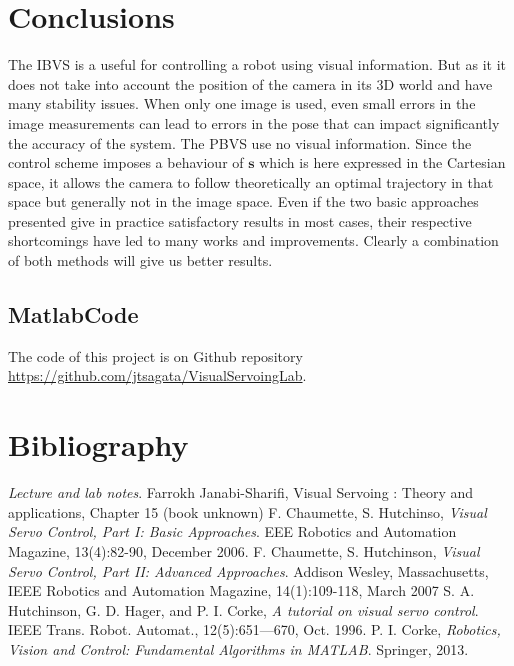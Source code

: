 \documentclass[a4paper,12pt]{article}
\begin{document}
\section{Conclusions}
The IBVS is a useful for controlling a robot using visual information. But as it it does not take into
account the position of the camera in its 3D world and have many stability issues.   When  only  one
image  is  used,  even  small  errors  in  the  image  measurements can lead to errors in the pose that can impact significantly the accuracy of the system.
The  PBVS use no visual information.  Since  the  control  scheme  imposes  a  behaviour  of  $\mathbf{s}$ which  is  here  expressed  in  the  Cartesian  space,  it  allows  the camera  to  follow  theoretically  an  optimal  trajectory  in  that space  but  generally  not  in  the  image  space. 
Even if the two basic approaches presented   give in practice satisfactory results in most cases, their
respective shortcomings have led to many works and improvements. Clearly a combination of both methods will give us better results.
\subsection{MatlabCode}
The code of this project is on Github repository \url{https://github.com/jtsagata/VisualServoingLab}.
\FloatBarrier
\section{Bibliography}
\begin{thebibliography}{9}
  \emph{Lecture and lab notes}.
  Farrokh Janabi-Sharifi,
  Visual Servoing : Theory and applications, Chapter 15 (book unknown)
  F. Chaumette, S. Hutchinso,
  \emph{ Visual Servo Control, Part I: Basic Approaches}.
EEE Robotics and Automation Magazine, 13(4):82-90, December 2006.
  F. Chaumette, S. Hutchinson,
  \emph{Visual Servo Control, Part II: Advanced Approaches}.
  Addison Wesley, Massachusetts,
IEEE Robotics and Automation Magazine, 14(1):109-118, March 2007
 S. A. Hutchinson, G. D. Hager, and P. I. Corke,
\emph{ A tutorial on visual servo control}.
        IEEE Trans. Robot. Automat., 12(5):651—670, Oct. 1996.
 P. I. Corke,
\emph{ Robotics, Vision and Control: Fundamental Algorithms in MATLAB}.
        Springer, 2013.
\end{thebibliography}
\clearpage 
\end{document}

